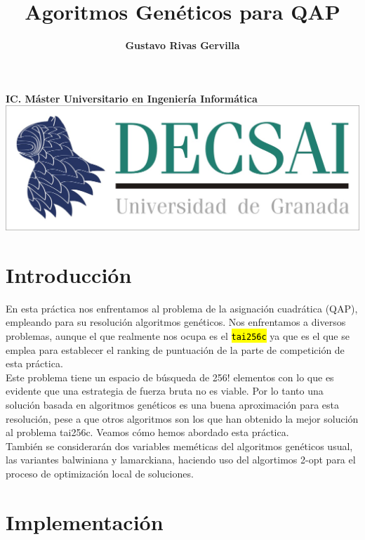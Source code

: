 \documentclass[10pt,a4paper]{article}
\author{\textbf{Gustavo Rivas Gervilla}}
\title{\textcolor{deepblue}{\textbf{Agoritmos Genéticos para QAP}}}
\date{}
\newcommand{\code}[1]{\sethlcolor{light-gray}\hl{\texttt{#1}}} %
\begin{document}
\maketitle
\begin{center}
\textbf{IC. Máster Universitario en Ingeniería Informática}
\newline
\newline
\newline
\includegraphics[scale=0.5]{img/decsai}
\end{center}

\newpage
\tableofcontents
\newpage

\def\layersep{2.5cm}

\section{Introducción}

En esta práctica nos enfrentamos al problema de la asignación cuadrática (QAP), empleando para su resolución algoritmos genéticos. Nos enfrentamos a diversos problemas, aunque el que realmente nos ocupa es el \code{tai256c} ya que es el que se emplea para establecer el ranking de puntuación de la parte de competición de esta práctica.\\

Este problema tiene un espacio de búsqueda de 256! elementos con lo que es evidente que una estrategia de fuerza bruta no es viable. Por lo tanto una solución basada en algoritmos genéticos es una buena aproximación para esta resolución, pese a que otros algoritmos son los que han obtenido la mejor solución al problema tai256c. Veamos cómo hemos abordado esta práctica.\\

También se considerarán dos variables meméticas del algoritmos genéticos usual, las variantes balwiniana y lamarckiana, haciendo uso del algortimos 2-opt para el proceso de optimización local de soluciones.

\section{Implementación}
\end{document}
